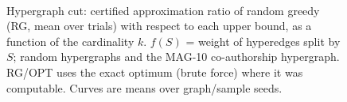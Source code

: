 \begin{figure}[t]
\centering
\setlength{\rgplotwidth}{0.245\textwidth}
\\[1pt]
\hfill
\hfill

\caption{Hypergraph cut: certified approximation ratio of random greedy (RG, mean over trials) with respect to each upper bound, as a function of the cardinality $k$. $f(S)$ = weight of hyperedges split by $S$; random hypergraphs and the MAG-10 co-authorship hypergraph. RG/OPT uses the exact optimum (brute force) where it was computable. Curves are means over graph/sample seeds.}
\label{fig:rg-hypergraph_cut-wide}
\end{figure}
